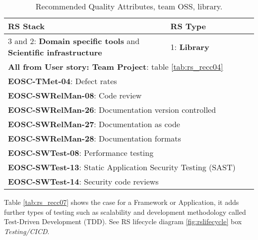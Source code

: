 \begin{center}
\begin{table}

  \label{tab:rs_recc06}
  \small
  \begin{tabular}{|p{0.65\linewidth}|p{0.35\linewidth}|} \hline

    \textbf{RS Stack} & \textbf{RS Type} \\ \hline \hline
    3 and 2: \textbf{Domain specific tools} and  \textbf{Scientific infrastructure} &
    1: \textbf{Library} \\ \hline \hline
    \multicolumn{2}{|l|}{\textbf{All from User story: Team Project}: table \ref{tab:rs_recc04}} \\ \hline
    \multicolumn{2}{|l|}{\textbf{EOSC-TMet-04}: Defect rates} \\ \hline
    \multicolumn{2}{|l|}{\textbf{EOSC-SWRelMan-08}: Code review} \\ \hline
    \multicolumn{2}{|l|}{\textbf{EOSC-SWRelMan-26}: Documentation version controlled} \\ \hline
    \multicolumn{2}{|l|}{\textbf{EOSC-SWRelMan-27}: Documentation as code} \\ \hline
    \multicolumn{2}{|l|}{\textbf{EOSC-SWRelMan-28}: Documentation formats} \\ \hline
    \multicolumn{2}{|l|}{\textbf{EOSC-SWTest-08}: Performance testing} \\ \hline
    \multicolumn{2}{|l|}{\textbf{EOSC-SWTest-13}: Static Application Security Testing (SAST)} \\ \hline
    \multicolumn{2}{|l|}{\textbf{EOSC-SWTest-14}: Security code reviews} \\ \hline

  \end{tabular}
  \caption{Recommended Quality Attributes, team OSS, library.}
\end{table}
\end{center}

Table \ref{tab:rs_recc07} shows the case for a Framework or Application, it adds further types of testing such as scalability and development methodology called Test-Driven Development (TDD). See RS lifecycle diagram \ref{fig:rslifecycle} box \textit{Testing/CICD}.

